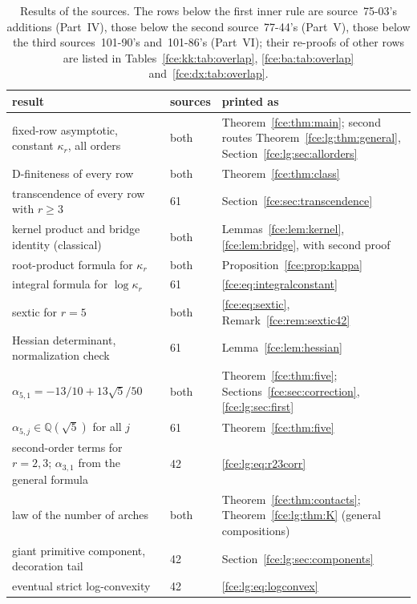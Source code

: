 \documentclass[11pt,a4paper]{article}
\numberwithin{equation}{section}
\theoremstyle{definition}\newtheorem{definition}[theorem]{Definition}
\theoremstyle{remark}\newtheorem{remark}[theorem]{Remark}
\newcommand{\Q}{\mathbb Q}
\begin{document}
\begin{table}[!ht]
\centering\small
\caption{Results of the sources. The rows below the first inner rule are
source~75-03's additions (Part~IV), those below the second source~77-44's
(Part~V), those below the third sources~101-90's and~101-86's (Part~VI);
their re-proofs of other rows are listed in
Tables~\ref{fce:kk:tab:overlap}, \ref{fce:ba:tab:overlap}
and~\ref{fce:dx:tab:overlap}.}\label{fce:tab:crosswalk}
\begin{tabular}{@{}>{\raggedright\arraybackslash}p{}l>{\raggedright\arraybackslash}p{}@{}}
\toprule
result & sources & printed as\\
\midrule
fixed-row asymptotic, constant $\kappa_r$, all orders & both &
 Theorem~\ref{fce:thm:main}; second routes Theorem~\ref{fce:lg:thm:general},
 Section~\ref{fce:lg:sec:allorders}\\
D-finiteness of every row & both & Theorem~\ref{fce:thm:class}\\
transcendence of every row with $r\ge3$ & 61 & Section~\ref{fce:sec:transcendence}\\
kernel product and bridge identity (classical) & both &
 Lemmas~\ref{fce:lem:kernel}, \ref{fce:lem:bridge}, with second proof\\
root-product formula for $\kappa_r$ & both & Proposition~\ref{fce:prop:kappa}\\
integral formula for $\log\kappa_r$ & 61 & \eqref{fce:eq:integralconstant}\\
sextic for $r=5$ & both & \eqref{fce:eq:sextic}, Remark~\ref{fce:rem:sextic42}\\
Hessian determinant, normalization check & 61 & Lemma~\ref{fce:lem:hessian}\\
$\alpha_{5,1}=-13/10+13\sqrt5/50$ & both & Theorem~\ref{fce:thm:five};
 Sections~\ref{fce:sec:correction}, \ref{fce:lg:sec:first}\\
$\alpha_{5,j}\in\Q(\sqrt5)$ for all $j$ & 61 & Theorem~\ref{fce:thm:five}\\
second-order terms for $r=2,3$; $\alpha_{3,1}$ from the general formula & 42 &
 \eqref{fce:lg:eq:r23corr}\\
law of the number of arches & both & Theorem~\ref{fce:thm:contacts};
 Theorem~\ref{fce:lg:thm:K} (general compositions)\\
giant primitive component, decoration tail & 42 & Section~\ref{fce:lg:sec:components}\\
eventual strict log-convexity & 42 & \eqref{fce:lg:eq:logconvex}\\

\end{tabular}
\end{table}
\end{document}
